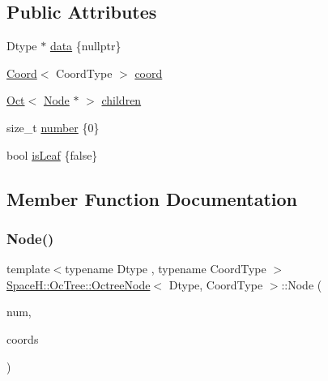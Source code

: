 \subsection*{Public Attributes}
\begin{DoxyCompactItemize}
\item 
Dtype $\ast$ \mbox{\hyperlink{struct_space_h_1_1_oc_tree_1_1_octree_node_a8cf9586b830ca9bcd9e3d7ed668d9612}{data}} \{nullptr\}
\item 
\mbox{\hyperlink{struct_space_h_1_1_oc_tree_1_1_coord}{Coord}}$<$ Coord\+Type $>$ \mbox{\hyperlink{struct_space_h_1_1_oc_tree_1_1_octree_node_a6e84d105617b6215ebc85feb17246f6e}{coord}}
\item 
\mbox{\hyperlink{struct_space_h_1_1_oc_tree_1_1_oct}{Oct}}$<$ \mbox{\hyperlink{struct_space_h_1_1_oc_tree_1_1_octree_node_ad705e740d831361cd8f99ea9bb96742a}{Node}} $\ast$ $>$ \mbox{\hyperlink{struct_space_h_1_1_oc_tree_1_1_octree_node_a6b658825d9ba4272873f7a57f860f8f0}{children}}
\item 
size\+\_\+t \mbox{\hyperlink{struct_space_h_1_1_oc_tree_1_1_octree_node_ad1cd17e82094b677b971151652b28067}{number}} \{0\}
\item 
bool \mbox{\hyperlink{struct_space_h_1_1_oc_tree_1_1_octree_node_a50a0de4997b3b1256d623a0c44d59265}{is\+Leaf}} \{false\}
\end{DoxyCompactItemize}


\subsection{Member Function Documentation}
\mbox{\label{struct_space_h_1_1_oc_tree_1_1_octree_node_ad705e740d831361cd8f99ea9bb96742a}} 
\subsubsection{\texorpdfstring{Node()}{Node()}}
{\footnotesize\ttfamily template$<$typename Dtype , typename Coord\+Type $>$ \\
\mbox{\hyperlink{struct_space_h_1_1_oc_tree_1_1_octree_node}{Space\+H\+::\+Oc\+Tree\+::\+Octree\+Node}}$<$ Dtype, Coord\+Type $>$\+::Node (\begin{DoxyParamCaption}\item[{size\+\_\+t}]{num,  }\item[{\mbox{\hyperlink{struct_space_h_1_1_oc_tree_1_1_coord}{Coord}}$<$ Coord\+Type $>$ \&}]{coords }\end{DoxyParamCaption})\hspace{0.3cm}{\ttfamily [inline]}}



